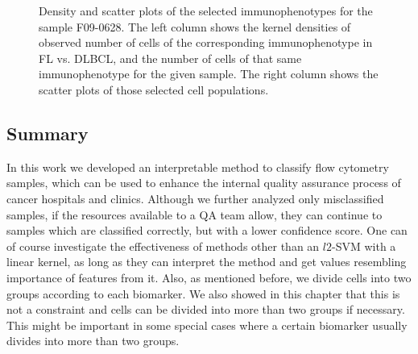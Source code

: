 \begin{figure}[!ht]
{  }
  \caption{Density and scatter plots of the selected immunophenotypes for the sample F09-0628. The left column shows the kernel densities of observed number of cells of the corresponding immunophenotype in FL vs. DLBCL, and the number of cells of that same immunophenotype for the given sample. The right column shows the scatter plots of those selected cell populations.}
  \label{fig:fcs-qa-density-scatter-DLBCL}
\end{figure}

\subsection{Summary}
In this work we developed an interpretable method to classify flow cytometry samples, which can be used to enhance the internal quality assurance process of cancer hospitals and clinics. Although we further analyzed only misclassified samples, if the resources available to a QA team allow, they can continue to samples which are classified correctly, but with a lower confidence score. One can of course investigate the effectiveness of methods other than an $l2$-SVM with a linear kernel, as long as they can interpret the method and get values resembling importance of features from it. Also, as mentioned before, we divide cells into two groups according to each biomarker. We also showed in this chapter that this is not a constraint and cells can be divided into more than two groups if necessary. This might be important in some special cases where a certain biomarker usually divides into more than two groups.


